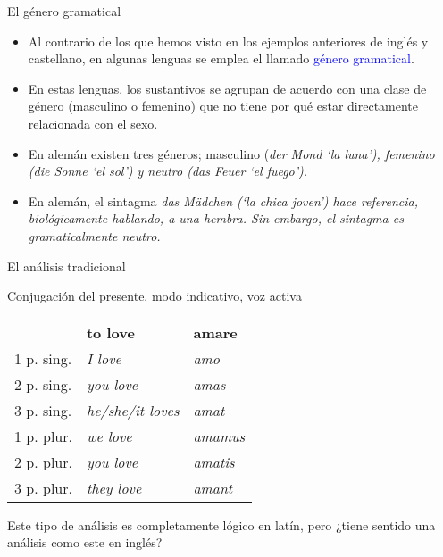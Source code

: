 \documentclass{beamer}
\begin{document}
\begin{frame}{El género gramatical}

\begin{itemize}
    \item Al contrario de los que hemos visto en los ejemplos anteriores de inglés y castellano, en algunas lenguas se emplea el llamado \textcolor{blue}{género gramatical}.
    \item En estas lenguas, los sustantivos se agrupan de acuerdo con una clase de género (masculino o femenino) que no tiene por qué estar directamente relacionada con el sexo.
    \item En alemán existen tres géneros; masculino (\it{der Mond} `la luna'), femenino (\it{die Sonne} `el sol') y neutro (\it{das Feuer} `el fuego').  
    \item En alemán, el sintagma \it{das Mädchen} (`la chica joven') hace referencia,  biológicamente hablando, a una hembra. Sin embargo, el sintagma es gramaticalmente neutro.
\end{itemize}
\end{frame}


\begin{frame}{El análisis tradicional}

Conjugación del presente, modo indicativo, voz activa
\begin{center}
\begin{tabular}{l l l}
 & \bf{to love} & \bf{amare} \\
1 p. sing. & \it{I love} & \it{amo} \\ 
2 p. sing. & \it{you love} & \it{amas} \\ 
3 p. sing. & \it{he/she/it loves} & \it{amat} \\
\hline 
1 p. plur. & \it{we love} & \it{amamus} \\ 
2 p. plur. & \it{you love} & \it{amatis} \\ 
3 p. plur. & \it{they love} & \it{amant} \\ 
\end{tabular}
\end{center}

Este tipo de análisis es completamente lógico en latín, pero ¿tiene sentido una análisis como este en inglés?
\end{frame}
\end{document}
